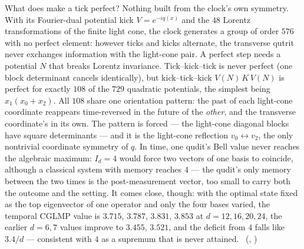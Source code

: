 What does make a tick perfect? Nothing built from the clock's own symmetry. With its Fourier-dual potential kick
$V=e^{-iq(x)}$ and the $48$ Lorentz transformations of the finite light cone, the clock generates a group of order $576$
with no perfect element: however ticks and kicks alternate, the transverse qutrit never exchanges information with the
light-cone pair. A perfect step needs a potential $N$ that breaks Lorentz invariance. Tick--kick--tick is never perfect
(one block determinant cancels identically), but kick--tick--kick $V(N)\,K\,V(N)$ is perfect for exactly $108$ of the
$729$ quadratic potentials, the simplest being $x_1(x_0+x_2)$. All $108$ share one orientation pattern: the past of each
light-cone coordinate reappears time-reversed in the future of the \emph{other}, and the transverse coordinate's in its
own. The pattern is forced --- the light-cone diagonal blocks have square determinants --- and it is the light-cone
reflection $v_0\leftrightarrow v_2$, the only nontrivial coordinate symmetry of $q$. In time, one qudit's Bell value never reaches the algebraic maximum: $I_d=4$ would force two vectors of one basis to
coincide, although a classical system with memory reaches $4$ --- the qudit's only memory between the two times is the
post-measurement vector, too small to carry both the outcome and the setting. It comes close, though: with the optimal
state fixed as the top eigenvector of one operator and only the four bases varied, the temporal CGLMP value is $3.715$,
$3.787$, $3.831$, $3.853$ at $d=12,16,20,24$, the earlier $d=6,7$ values improve to $3.455$, $3.521$, and the deficit
from $4$ falls like $3.4/d$ --- consistent with $4$ as a supremum that is never attained.
\tierC\ (, )

